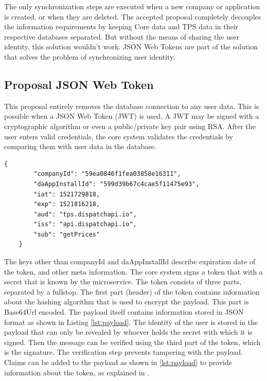 The only synchronization steps are executed when a new company or application is created, or when they are deleted. The accepted proposal completely decouples the information requirements by keeping Core data and TPS data in their respective databases separated. But without the means of sharing the user identity, this solution wouldn't work. JSON Web Tokens are part of the solution that solves the problem of synchronizing user identity.

\subsection{Proposal JSON Web Token}
This proposal entirely removes the database connection to any user data. This is possible when a JSON Web Token (JWT) is used. A JWT may be signed with a cryptographic algorithm or even a public/private key pair using RSA. After the user enters valid credentials, the core system validates the credentials by comparing them with user data in the database.

\begin{lstlisting}[caption={Two user identifiers and registered claim names stored inside the payload of a JSON web token.}, label={lst:payload}]
	{
		"companyId": "59ea0846f1fea03858e16311",
		"daAppInstallId": "599d39b67c4cae5f11475e93",
		"iat": 1521729818,
		"exp": 1521816218,
		"aud": "tps.dispatchapi.io",
		"iss": "api.dispatchapi.io",
		"sub": "getPrices"
	}
\end{lstlisting}

The keys other than companyId and daAppInstallId describe expiration date of the token, and other meta information. The core system signs a token that with a secret that is known by the microservice. The token consists of three parts, separated by a fullstop. The first part (header) of the token contains information about the hashing algorithm that is used to encrypt the payload. This part is Base64Url encoded. The payload itself contains information stored in JSON format as shown in Listing \ref{lst:payload}. The identity of the user is stored in the payload that can only be revealed by whoever holds the secret with which it is signed. Then the message can be verified using the third part of the token, which is the signature. The verification step prevents tampering with the payload. Claims can be added to the payload as shown in \ref{lst:payload} to provide information about the token, as explained in \cite{JWT}.

